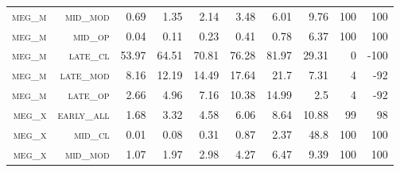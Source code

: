 \begin{landscape}
\begin{table}[!htbp]
\begin{tabular}{@{}rrrrrrr|rrr@{}}
\footnotesize \textsc{meg\_m}      & \footnotesize \textsc{mid\_mod  }      & \footnotesize 0.69           & \footnotesize 1.35             & \footnotesize 2.14      & \footnotesize 3.48            & \footnotesize 6.01       & \footnotesize 9.76     & \footnotesize 100   & \footnotesize 100      \\
\footnotesize \textsc{meg\_m}      & \footnotesize \textsc{mid\_op   }      & \footnotesize 0.04           & \footnotesize 0.11             & \footnotesize 0.23      & \footnotesize 0.41            & \footnotesize 0.78       & \footnotesize 6.37     & \footnotesize 100   & \footnotesize 100      \\
\footnotesize \textsc{meg\_m}      & \footnotesize \textsc{late\_cl  }      & \footnotesize 53.97          & \footnotesize 64.51            & \footnotesize 70.81     & \footnotesize 76.28           & \footnotesize 81.97      & \footnotesize 29.31    & \footnotesize 0     & \footnotesize -100      \\
\footnotesize \textsc{meg\_m}      & \footnotesize \textsc{late\_mod }      & \footnotesize 8.16           & \footnotesize 12.19            & \footnotesize 14.49     & \footnotesize 17.64           & \footnotesize 21.7       & \footnotesize 7.31     & \footnotesize 4     & \footnotesize -92      \\
\footnotesize \textsc{meg\_m}      & \footnotesize \textsc{late\_op  }      & \footnotesize 2.66           & \footnotesize 4.96             & \footnotesize 7.16      & \footnotesize 10.38           & \footnotesize 14.99      & \footnotesize 2.5      & \footnotesize 4     & \footnotesize -92      \\
\footnotesize \textsc{meg\_x}      & \footnotesize \textsc{early\_all}      & \footnotesize 1.68           & \footnotesize 3.32             & \footnotesize 4.58      & \footnotesize 6.06            & \footnotesize 8.64       & \footnotesize 10.88    & \footnotesize 99    & \footnotesize 98       \\
\footnotesize \textsc{meg\_x}      & \footnotesize \textsc{mid\_cl   }      & \footnotesize 0.01           & \footnotesize 0.08             & \footnotesize 0.31      & \footnotesize 0.87            & \footnotesize 2.37       & \footnotesize 48.8     & \footnotesize 100   & \footnotesize 100      \\
\footnotesize \textsc{meg\_x}      & \footnotesize \textsc{mid\_mod  }      & \footnotesize 1.07           & \footnotesize 1.97             & \footnotesize 2.98      & \footnotesize 4.27            & \footnotesize 6.47       & \footnotesize 9.39     & \footnotesize 100   & \footnotesize 100      \\

\end{tabular}
\end{table}
\end{landscape}

